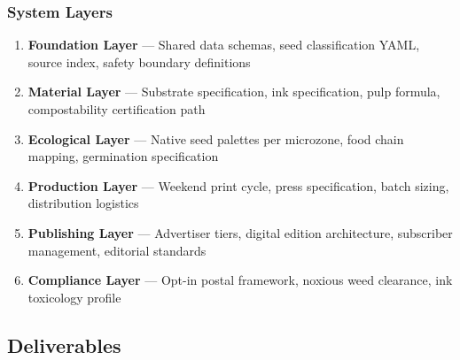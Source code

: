 \documentclass[11pt,letterpaper]{article}
\begin{document}
\subsubsection{System Layers}
\begin{enumerate}
  \item \textbf{Foundation Layer} --- Shared data schemas, seed classification YAML, source index, safety boundary definitions
  \item \textbf{Material Layer} --- Substrate specification, ink specification, pulp formula, compostability certification path
  \item \textbf{Ecological Layer} --- Native seed palettes per microzone, food chain mapping, germination specification
  \item \textbf{Production Layer} --- Weekend print cycle, press specification, batch sizing, distribution logistics
  \item \textbf{Publishing Layer} --- Advertiser tiers, digital edition architecture, subscriber management, editorial standards
  \item \textbf{Compliance Layer} --- Opt-in postal framework, noxious weed clearance, ink toxicology profile
\end{enumerate}

\subsection{Deliverables}
\end{document}
